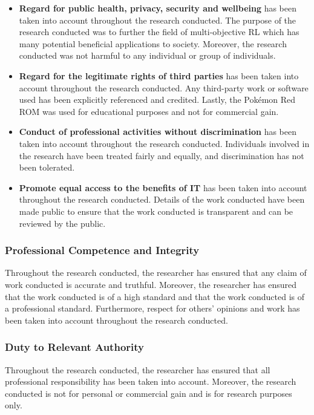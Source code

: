 \begin{itemize}
    \item \textbf{Regard for public health, privacy, security and wellbeing} has been taken into account throughout the research conducted. The purpose of the research conducted was to further the field of multi-objective RL which has many potential beneficial applications to society. Moreover, the research conducted was not harmful to any individual or group of individuals.
    
    \item \textbf{Regard for the legitimate rights of third parties} has been taken into account throughout the research conducted. Any third-party work or software used has been explicitly referenced and credited. Lastly, the Pokémon Red ROM was used for educational purposes and not for commercial gain.
    
    \item \textbf{Conduct of professional activities without discrimination} has been taken into account throughout the research conducted. Individuals involved in the research have been treated fairly and equally, and discrimination has not been tolerated.

    \item \textbf{Promote equal access to the benefits of IT} has been taken into account throughout the research conducted. Details of the work conducted have been made public to ensure that the work conducted is transparent and can be reviewed by the public.
\end{itemize}

\subsubsection{Professional Competence and Integrity}

Throughout the research conducted, the researcher has ensured that any claim of work conducted is accurate and truthful. Moreover, the researcher has ensured that the work conducted is of a high standard and that the work conducted is of a professional standard. Furthermore, respect for others' opinions and work has been taken into account throughout the research conducted. 

\subsubsection{Duty to Relevant Authority}

Throughout the research conducted, the researcher has ensured that all professional responsibility has been taken into account. Moreover, the research conducted is not for personal or commercial gain and is for research purposes only. 